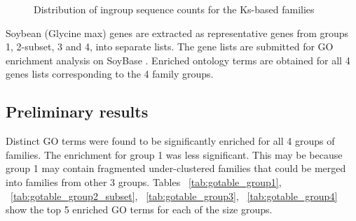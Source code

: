 \documentclass{article}
\begin{document}
		\begin{figure}[h!]
			\caption{Distribution of ingroup sequence counts for the Ks-based families}
			\label{fig:hist_lgf5_family_size_groups}
		\end{figure}
	
		Soybean (Glycine max) genes are extracted as representative genes from groups 1, 2-subset, 3 and 4, into separate lists. The gene lists are submitted for GO enrichment analysis on SoyBase \citep{grant2009soybase}. Enriched ontology terms are obtained for all 4 genes lists corresponding to the 4 family groups.
		
		\subsection{Preliminary results}
		Distinct GO terms were found to be significantly enriched for all 4 groups of families. The enrichment for group 1 was less significant. This may be because group 1 may contain fragmented under-clustered families that could be merged into families from other 3 groups. Tables ~\ref{tab:gotable_group1}, ~\ref{tab:gotable_group2_subset}, ~\ref{tab:gotable_group3}, ~\ref{tab:gotable_group4} show the top 5 enriched GO terms for each of the size groups.
		
\end{document}
